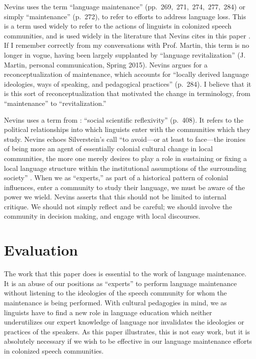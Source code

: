 \documentclass[man,12pt,natbib]{apa6}
\begin{document}
Nevins uses the term ``language maintenance'' (pp.~269,~271,~274,~277,~284) or
simply ``maintenance'' (p.~272), to refer to efforts to address language loss.
This is a term used widely to refer to the actions of linguists in colonized
speech communities, and is used widely in the literature that Nevins cites in
this paper \citep{Fase92,LiebeHarkort79}.  If I remember correctly from my
conversations with Prof. Martin, this term is no longer in vogue, having been
largely supplanted by ``language revitalization'' (J. Martin, personal
communication, Spring 2015).  Nevins argues for a reconceptualization of
maintenance, which accounts for ``locally derived language ideologies, ways of
speaking, and pedagogical practices'' (p.~284).  I believe that it is this sort
of reconceptualization that motivated the change in terminology, from
``maintenance'' to ``revitalization.''

Nevins uses a term from \citet{Silverstein98}: ``social scientific
reflexivity'' (p.~408). It refers to the political relationships into which
linguists enter with the communities which they study. Nevins echoes
Silverstein's call ``to avoid---or at least to face---the ironies of being more
an agent of essentially colonial cultural change in local communities, the more
one merely desires to play a role in sustaining or fixing a local language
structure within the institutional assumptions of the surrounding society''
\citet[p.~408]{Silverstein98}. When we as ``experts,'' as part of a historical
pattern of colonial influences, enter a community to study their language, we
must be aware of the power we wield. Nevins asserts that this should not be
limited to internal critique. We should not simply reflect and be careful; we
should involve the community in decision making, and engage with local
discourses.


\section{Evaluation}

The work that this paper does is essential to the work of language maintenance.
It is an abuse of our positions as ``experts'' to perform language maintenance
without listening to the ideologies of the speech community for whom the
maintenance is being performed. With cultural pedagogies in mind, we as
linguists have to find a new role in language education which neither
underutilizes our expert knowledge of language nor invalidates the ideologies
or practices of the speakers. As this paper illustrates, this is not easy work,
but it is absolutely necessary if we wish to be effective in our language
maintenance efforts in colonized speech communities.
\end{document}
